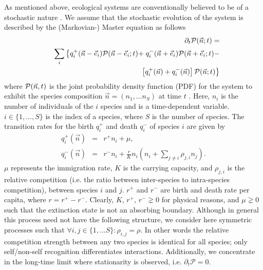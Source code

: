 \documentclass[%
 amsmath,amssymb,
reprint,%
linenumbers]{revtex4-2}
\begin{document}


As mentioned above, ecological systems are conventionally believed to be of a stochastic nature \cite{black2012stochastic}. 
We assume that the stochastic evolution of the system is described by the (Markovian-) Master equation as follows
\begin{eqnarray}
&& \partial_t  
{\rm \mathcal{P}}(\vec{n};t)= \label{master-eq}
\\ \nonumber
&&\sum_{i}\left\{q^+_i (\vec{n}-\vec{e}_i){\rm \mathcal{P}}(\vec{n}-\vec{e}_i;t)+ \right.
q^-_i (\vec{n}+\vec{e}_i){\rm \mathcal{P}}(\vec{n}+\vec{e}_i;t)- \\
&& \left. \left[q^+_i(\vec{n})+q^-_i(\vec{n})\right]{\rm \mathcal{P}}(\vec{n};t)
\right\}    \nonumber
\end{eqnarray}
where ${\rm \mathcal{P}}(\vec{n},t)$ is the joint probability density function (PDF) for the system to exhibit the species composition $\vec{n}=(n_1,\dots n_S)$ at time $t$ \cite{gardiner1985handbook}.
Here, $n_i$ is the number of individuals of the $i$ species and is a time-dependent variable. 
$i\in \{1,\dots,S\}$ is the index of a species, where $S$ is the number of species. 
The transition rates for the birth $q^+_i$ and death $q^-_i$ of species $i$ are given by 
\begin{eqnarray}
q_i^+(\vec{n})&=&r^+ n_i +\mu,  \\
q_i^-(\vec{n})&=&r^- n_i + \frac{r}{K} n_i \left(n_i +\sum_{j\neq i} \rho _{j,i} n_j\right). \nonumber
\end{eqnarray}
$\mu$ represents the immigration rate, $K$ is the carrying capacity, and $\rho_{j,i}$ is the relative competition (i.e. the ratio between inter-species to intra-species competition), between species $i$ and $j$. $r^+$ and $r^-$ are birth and death rate per capita, where $r=r^+-r^-$. 
Clearly, $K$, $r^+$, $r^-\gneq
0$ for physical reasons, and $\mu\gneq 0$ such that the extinction state is not an absorbing boundary.    
Although in general this process need not have the following structure, we consider here symmetric processes such that $\forall i,j\in \{1,\dots S\}:\rho_{i,j}=\rho$.
In other words the relative competition strength between any two species is identical for all species; only self/non-self recognition differentiates interactions. Additionally, we concentrate in the long-time limit where stationarity is observed, i.e. $\partial_t \mathcal{P}=0$.
\end{document}
